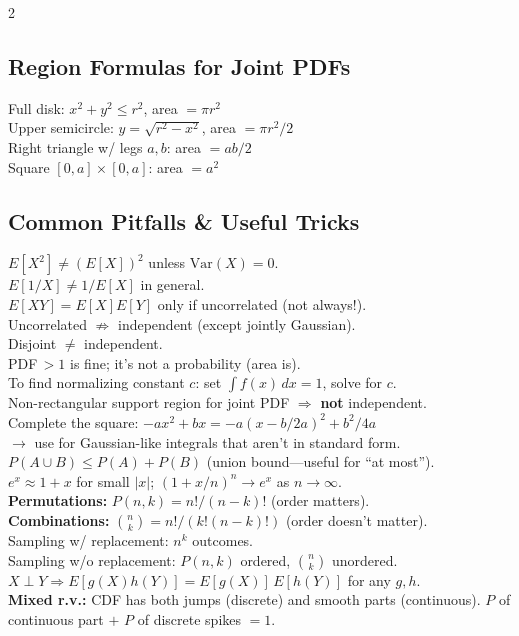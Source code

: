 \documentclass[10pt]{article}
\begin{document}
\begin{multicols*}{2}
\subsection{Region Formulas for Joint PDFs}
Full disk: $x^2+y^2 \le r^2$, area $= \pi r^2$ \\
Upper semicircle: $y = \sqrt{r^2 - x^2}$, area $= \pi r^2/2$ \\
Right triangle w/ legs $a,b$: area $= ab/2$ \\
Square $[0,a]\times[0,a]$: area $= a^2$

\subsection{Common Pitfalls \& Useful Tricks}
$E[X^2] \ne (E[X])^2$ unless $\text{Var}(X)=0$. \\
$E[1/X] \ne 1/E[X]$ in general. \\
$E[XY] = E[X]E[Y]$ only if uncorrelated (not always!). \\
Uncorrelated $\not\Rightarrow$ independent (except jointly Gaussian). \\
Disjoint $\ne$ independent. \\
PDF$\,>1$ is fine; it's not a probability (area is). \\
To find normalizing constant $c$: set $\int f(x)\,dx = 1$, solve for $c$. \\
Non-rectangular support region for joint PDF $\Rightarrow$ \textbf{not} independent. \\
Complete the square: $-ax^2 + bx = -a(x - b/2a)^2 + b^2/4a$ \\
$\to$ use for Gaussian-like integrals that aren't in standard form. \\
$P(A \cup B) \le P(A) + P(B)$ (union bound---useful for ``at most''). \\
$e^x \approx 1 + x$ for small $|x|$;\; $(1+x/n)^n \to e^x$ as $n \to \infty$. \\
\textbf{Permutations:} $P(n,k) = n!/(n-k)!$ (order matters). \\
\textbf{Combinations:} $\binom{n}{k} = n!/(k!(n-k)!)$ (order doesn't matter). \\
Sampling w/ replacement: $n^k$ outcomes. \\
Sampling w/o replacement: $P(n,k)$ ordered, $\binom{n}{k}$ unordered. \\
$X \perp Y \Rightarrow E[g(X)h(Y)] = E[g(X)]\,E[h(Y)]$ for any $g,h$. \\
\textbf{Mixed r.v.:} CDF has both jumps (discrete) and smooth parts (continuous). $P$ of continuous part $+$ $P$ of discrete spikes $= 1$.

\end{multicols*}
\end{document}
